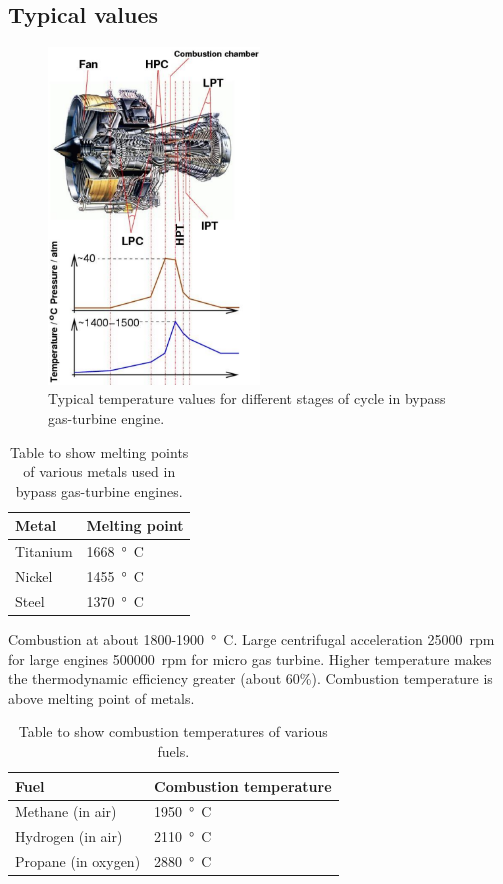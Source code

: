 \subsection{Typical values}
\begin{figure}[H]
    \centering
    \includegraphics[width =0.5\textwidth]{img/figure21.png}
    \caption{Typical temperature values for different stages of cycle in bypass gas-turbine engine.}
\end{figure}
\begin{table}[H]
    \centering
    \begin{tabular}{@{}ll@{}}
        \toprule
        \textbf{Metal} & \textbf{Melting point} \\
        \midrule
        Titanium       & \SI{1668}{\degree C}   \\
        Nickel         & \SI{1455}{\degree C}   \\
        Steel          & \SI{1370}{\degree C}   \\
        \bottomrule
    \end{tabular}
    \caption{Table to show melting points of various metals used in bypass gas-turbine engines.}
\end{table}
Combustion at about 1800-\SI{1900}{\degree C}. Large centrifugal acceleration \SI{25000}{rpm} for large engines \SI{500000}{rpm} for micro gas turbine. Higher temperature makes the thermodynamic efficiency greater (about 60\%). Combustion temperature is above melting point of metals.
\begin{table}[H]
    \centering
    \begin{tabular}{@{}ll@{}}
        \toprule
        \textbf{Fuel}       & \textbf{Combustion temperature} \\
        \midrule
        Methane (in air)    & \SI{1950}{\degree C}            \\
        Hydrogen (in air)   & \SI{2110}{\degree C}            \\
        Propane (in oxygen) & \SI{2880}{\degree C}            \\
        \bottomrule
    \end{tabular}
    \caption{Table to show combustion temperatures of various fuels.}
\end{table}
